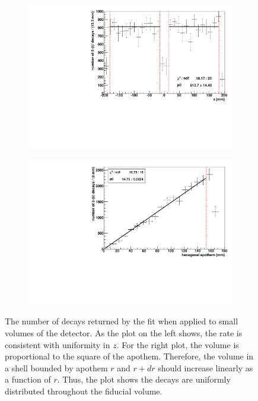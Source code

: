 \documentclass[herrin-thesis.tex]{subfiles}
\begin{document}
\begin{figure}[htp]
	\begin{subfigure}[c]{0.48\textwidth}
	\centering
	\includegraphics[width=\textwidth]{./plots/analysis_bb2n_rate_v_z.pdf}
	\end{subfigure}\hfill%
	\begin{subfigure}[c]{0.48\textwidth}
	\centering
	\includegraphics[width=\textwidth]{./plots/analysis_bb2n_rate_v_apothem.pdf}
	\end{subfigure}
\caption[Number of \twonu{} decays vs. position]{The number of \twonu{} decays returned by the fit when applied to small volumes of the detector. As the plot on the left shows, the rate is consistent with uniformity in \(z\). For the right plot, the volume is proportional to the square of the apothem. Therefore, the volume in a shell bounded by apothem \(r\) and \(r+dr\) should increase linearly as a function of \(r\). Thus, the plot shows the \twonu{} decays are uniformly distributed throughout the fiducial volume.}
\label{fig:analysis_bb2n_rate_v_pos}
\end{figure}
\end{document}
